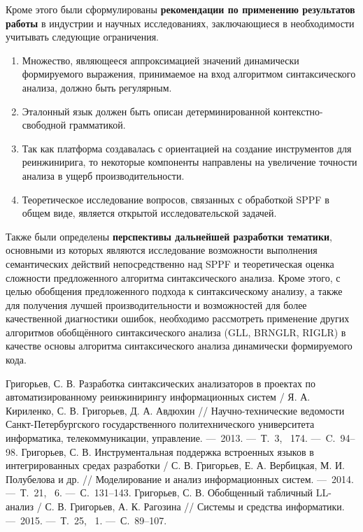 Кроме этого были сформулированы \textbf{рекомендации по применению результатов работы} в индустрии и научных исследованиях, заключающиеся в необходимости учитывать следующие ограничения.

\begin{enumerate}
    \item Множество, являющееся аппроксимацией значений динамически формируемого выражения, принимаемое на вход алгоритмом синтаксического анализа, должно быть регулярным.
    \item Эталонный язык должен быть описан детерминированной контекстно-свободной грамматикой.
    \item Так как платформа создавалась с ориентацией на создание инструментов для реинжинирига, то некоторые компоненты направлены на увеличение точности анализа в ущерб  производительности. 
    \item Теоретическое исследование вопросов, связанных с обработкой SPPF в общем виде, является открытой исследовательской задачей.
\end{enumerate}

Также были определены \textbf{перспективы дальнейшей разработки тематики}, основными из которых являются исследование возможности выполнения семантических действий непосредственно над SPPF и теоретическая оценка сложности предложенного алгоритма синтаксического анализа. Кроме этого, с целью обобщения предложенного подхода к синтаксическому анализу, а также для получения лучшей производительности и возможностей для более качественной диагностики ошибок, необходимо рассмотреть применение других алгоритмов обобщённого синтаксического анализа (GLL, BRNGLR, RIGLR) в качестве основы алгоритма синтаксического анализа динамически формируемого кода.




\renewcommand{\refname}{Публикации автора по теме диссертации в журналах из перечня российских рецензируемых научных журналов, в которых должны быть опубликованы основные научные результаты диссертаций на соискание ученых степеней доктора и кандидата наук}
\begin{thebibliography}{99}
 Григорьев, С. В. Разработка синтаксических анализаторов в проектах по автоматизированному реинжинирингу информационных систем / Я. А. Кириленко, С. В. Григорьев, Д. А. Авдюхин // Научно-технические ведомости Санкт-Петербургского государственного политехнического университета информатика, телекоммуникации, управление. ---~2013. ---~Т.~3, \textnumero~174. ---~C.~94--98.
 Григорьев, С. В. Инструментальная поддержка встроенных языков в интегрированных средах разработки / С. В. Григорьев, Е. А. Вербицкая, М. И. Полубелова и др. // Моделирование и анализ информационных систем. ---~2014. ---~Т.~21, \textnumero~6.  ---~С.~131--143.
 Григорьев, С. В. Обобщенный табличный LL-анализ / С. В. Григорьев, А. К. Рагозина // Системы и средства информатики. ---~2015. ---~Т.~25, \textnumero~1. ---~С.~89--107. 
\setcounter{firstbib}{\value{enumiv}}
\end{thebibliography}

